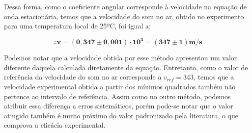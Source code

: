 Dessa forma, como o coeficiente angular corresponde à velocidade na equação de onda estacionária, temos que a velocidade do som no ar, obtido no experimento para uma temperatura local de 25ºC, foi igual a:

\[ \mathbf{\therefore v = (0,347 \pm 0,001) \cdot 10^3 = (347 \pm 1) m/s} \]

Podemos notar que a velocidade obtida por esse método apresentou um valor diferente daquela calculada diretamente da equação. Entretanto, como o valor de referência da velocidade do som no ar corresponde a $v_{ref} = 343$, temos que a velocidade experimental obtida a partir dos mínimos quadrados também não pertence ao intervalo de referência. Assim como no outro método, podemos atribuir essa diferença a erros sistemáticos, porém pode-se notar que o valor atingido também é muito próximo do valor padronizado pela literatura, o que comprova a eficácia experimental.
